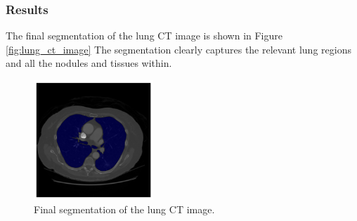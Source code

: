 \documentclass[11pt]{article}
\begin{document}
\subsubsection{Results}
The final segmentation of the lung CT image is shown in Figure \ref{fig:lung_ct_image} The segmentation clearly captures the relevant lung regions and all the nodules and tissues within.
\begin{figure}[H]
    \centering
    \includegraphics[width=0.4\textwidth]{figs/q1a.png}
    \caption{Final segmentation of the lung CT image.}
    \label{fig:lung_ct_segmentation}
\end{figure}
\end{document}
